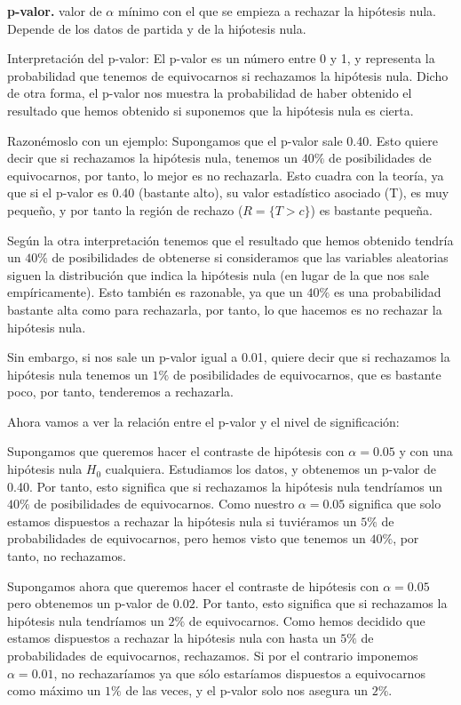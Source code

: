 \documentclass[nochap]{apuntes}
\begin{document}
\begin{defn}{\textbf{p-valor. }}
valor de $\alpha$ mínimo con el que se empieza a rechazar la hipótesis nula. Depende de los datos de partida y de la hiṕotesis nula.
\begin{expla}
Interpretación del p-valor: El p-valor es un número entre 0 y 1, y representa la probabilidad que tenemos de equivocarnos si rechazamos la hipótesis nula. Dicho de otra forma,  el p-valor nos muestra la probabilidad de haber obtenido el resultado que hemos obtenido si suponemos que la hipótesis nula es cierta.

Razonémoslo con un ejemplo:
Supongamos que el p-valor sale 0.40. Esto quiere decir que si rechazamos la hipótesis nula, tenemos un $40\%$ de posibilidades de equivocarnos, por tanto, lo mejor es no rechazarla. Esto cuadra con la teoría, ya que si el p-valor es 0.40 (bastante alto), su valor estadístico asociado (T), es muy pequeño, y por tanto la región de rechazo ($R=\{T>c\}$) es bastante pequeña.

Según la otra interpretación tenemos que el resultado que hemos obtenido tendría un $40\%$ de posibilidades de obtenerse si consideramos que las variables aleatorias siguen la distribución que indica la hipótesis nula (en lugar de la que nos sale empíricamente). Esto también es razonable, ya que un $40\%$ es una probabilidad bastante alta como para rechazarla, por tanto, lo que hacemos es no rechazar la hipótesis nula.

Sin embargo, si nos sale un p-valor igual a 0.01, quiere decir que si rechazamos la hipótesis nula tenemos un $1\%$ de posibilidades de equivocarnos, que es bastante poco, por tanto, tenderemos a rechazarla.
\end{expla}
\end{defn}

Ahora vamos a ver la relación entre el p-valor y el nivel de significación:
\begin{expla}
Supongamos que queremos hacer el contraste de hipótesis con $\alpha=0.05$ y con una hipótesis nula $H_0$ cualquiera. Estudiamos los datos, y obtenemos un p-valor de 0.40. Por tanto, esto significa que si rechazamos la hipótesis nula tendríamos un $40\%$ de posibilidades de equivocarnos. Como nuestro $\alpha=0.05$ significa que solo estamos dispuestos a rechazar la hipótesis nula si tuviéramos un $5\%$ de probabilidades de equivocarnos, pero hemos visto que tenemos un $40\%$, por tanto, no rechazamos.

Supongamos ahora que queremos hacer el contraste de hipótesis con $\alpha=0.05$ pero obtenemos un p-valor de $0.02$. Por tanto, esto significa que si rechazamos la hipótesis nula tendríamos un $2\%$ de equivocarnos. Como hemos decidido que estamos dispuestos a rechazar la hipótesis nula con hasta un $5\%$ de probabilidades de equivocarnos, rechazamos. Si por el contrario imponemos $\alpha=0.01$, no rechazaríamos ya que sólo estaríamos dispuestos a equivocarnos como máximo un $1\%$ de las veces, y el p-valor solo nos asegura un $2\%$.
\end{expla}
\end{document}
